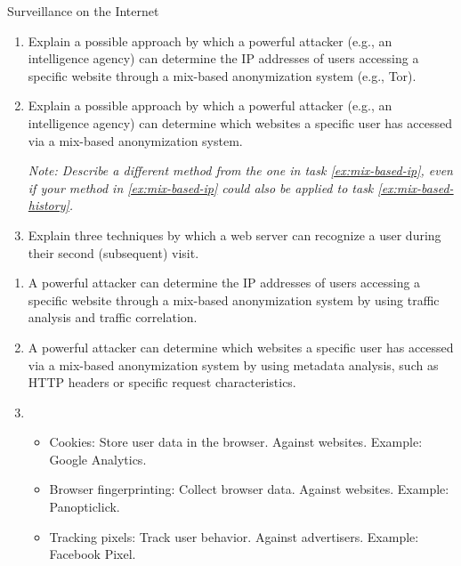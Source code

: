 \documentclass{article}
\begin{document}
\begin{exercise}{Surveillance on the Internet}
  \begin{enumerate}
    \item\label{ex:mix-based-ip} Explain a possible approach by which a powerful attacker (e.g., an intelligence agency) can determine the IP addresses of users accessing a specific website through a mix-based anonymization system (e.g., Tor).
    \item\label{ex:mix-based-history}  Explain a possible approach by which a powerful attacker (e.g., an intelligence agency) can determine which websites a specific user has accessed via a mix-based anonymization system.
      \par\textit{Note: Describe a different method from the one in task \ref{ex:mix-based-ip}, even if your method in \ref{ex:mix-based-ip} could also be applied to task \ref{ex:mix-based-history}.}
    \item Explain three techniques by which a web server can recognize a user during their second (subsequent) visit.
  \end{enumerate}

  \begin{solution}
    \begin{enumerate}
      \item A powerful attacker can determine the IP addresses of users accessing a specific website through a mix-based anonymization system by using traffic analysis and traffic correlation.
      \item A powerful attacker can determine which websites a specific user has accessed via a mix-based anonymization system by using metadata analysis, such as HTTP headers or specific request characteristics.
      \item \begin{itemize}
          \item Cookies: Store user data in the browser. Against websites. Example: Google Analytics.
          \item Browser fingerprinting: Collect browser data. Against websites. Example: Panopticlick.
          \item Tracking pixels: Track user behavior. Against advertisers. Example: Facebook Pixel.
        \end{itemize}
    \end{enumerate}
  \end{solution}
\end{exercise}
\end{document}
